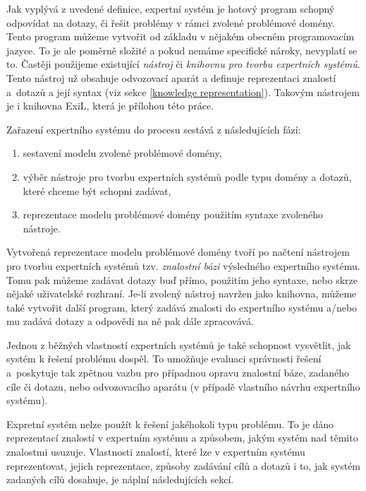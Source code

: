 Jak vyplývá z uvedené definice, expertní systém je hotový program schopný
odpovídat na dotazy, či řešit problémy v rámci zvolené problémové domény. Tento
program můžeme vytvořit od základu v nějakém obecném programovacím jazyce. To je
ale poměrně složité a pokud nemáme specifické nároky, nevyplatí se to.  Častěji
použijeme existující \emph{nástroj} či \emph{knihovnu pro tvorbu expertních
systémů}. Tento nástroj už obsahuje odvozovací aparát a definuje reprezentaci
znalostí a~dotazů a její syntax (viz sekce \ref{knowledge representation}).
Takovým nástrojem je i knihovna ExiL, která je přílohou této práce.

Zařazení expertního systému do procesu sestává z následujících fází:
\begin{enumerate}
  \item sestavení modelu zvolené problémové domény,
  \item výběr nástroje pro tvorbu expertních systémů podle typu domény a dotazů,
    které chceme být schopni zadávat,
  \item reprezentace modelu problémové domény použitím syntaxe zvoleného
    nástroje.
\end{enumerate}
Vytvořená reprezentace modelu problémové domény tvoří po načtení nástrojem pro
tvorbu expertních systémů tzv. \emph{znalostní bázi} výsledného expertního systému.
Tomu pak můžeme zadávat dotazy buď přímo, použitím jeho syntaxe, nebo skrze
nějaké uživatelské rozhraní. Je-li zvolený nástroj navržen jako knihovna, můžeme
také vytvořit další program, který zadává znalosti do expertního systému a/nebo
mu zadává dotazy a odpovědi na ně pak dále zpracovává.

Jednou z běžných vlastností expertních systémů je také schopnost vysvětlit, jak
systém k řešení problému dospěl. To umožňuje evaluaci správnosti řešení
a~poskytuje tak zpětnou vazbu pro případnou opravu znalostní báze, zadaného cíle
či dotazu, nebo odvozovacího aparátu (v případě vlastního návrhu expertního
systému).

Expretní systém nelze použít k řešení jakéhokoli typu problému. To je dáno
reprezentací znalostí v expertním systému a způsobem, jakým systém nad těmito
znalostmi usuzuje. Vlastnosti znalostí, které lze v expertním systému
reprezentovat, jejich reprezentace, způsoby zadávání cílů a dotazů i to, jak
systém zadaných cílů dosahuje, je náplní následujících sekcí.
